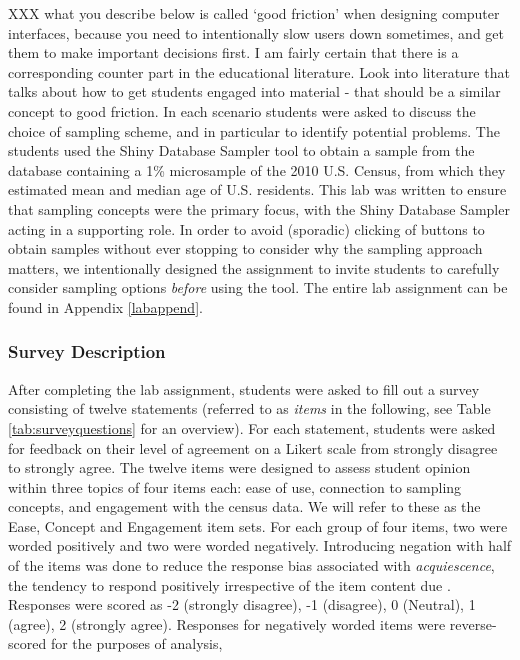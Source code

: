 \documentclass{article}\usepackage[]{graphicx}\usepackage[]{color}
\newcommand{\hh}[1]{{\color{ForestGreen} #1}}
\begin{document}
\hh{XXX what you describe below is called `good friction' when designing computer interfaces, because you need to intentionally slow users down sometimes, and get them to make important decisions first. I am fairly certain that there is a corresponding counter part in the educational literature. Look into literature that talks about how to get students engaged into material - that should be a similar concept to good friction.
}
In each scenario students were asked to discuss the choice of sampling scheme, and in particular to identify potential problems. The students used the Shiny Database Sampler tool to obtain a sample from the database containing a 1\% microsample of the 2010 U.S. Census, from which they estimated mean and median age of U.S. residents. This lab was written to ensure that sampling concepts were the primary focus, with the Shiny Database Sampler acting in a supporting role. In order to avoid (sporadic) clicking of buttons to obtain samples without ever stopping to consider why the sampling approach matters, we intentionally designed the assignment to invite students to carefully consider sampling options {\it before} using the tool. The entire lab assignment can be found in Appendix \ref{labappend}. 

 \subsubsection{Survey Description} 

After completing the lab assignment, students were asked to fill out a survey consisting of twelve statements (referred to as {\it items} in the following, see Table \ref{tab:surveyquestions} for an overview). For each statement, students were asked for feedback on their level of agreement on a Likert scale from strongly disagree to strongly agree. 
The twelve items were designed to assess student opinion within three topics of four items each: ease of use, connection to sampling concepts, and engagement with the census data.  We will refer to these as the Ease, Concept and Engagement item sets.  For each group of four items, two were worded positively and two were worded negatively. Introducing negation with half of the items was done to reduce the response bias associated with \textit{acquiescence}, the tendency to respond positively irrespective of the item content due \citep{Furnham1986}. Responses were scored as -2 (strongly disagree), -1 (disagree), 0 (Neutral), 1 (agree), 2 (strongly agree).  Responses for negatively worded items were reverse-scored for the purposes of analysis,
\end{document}
